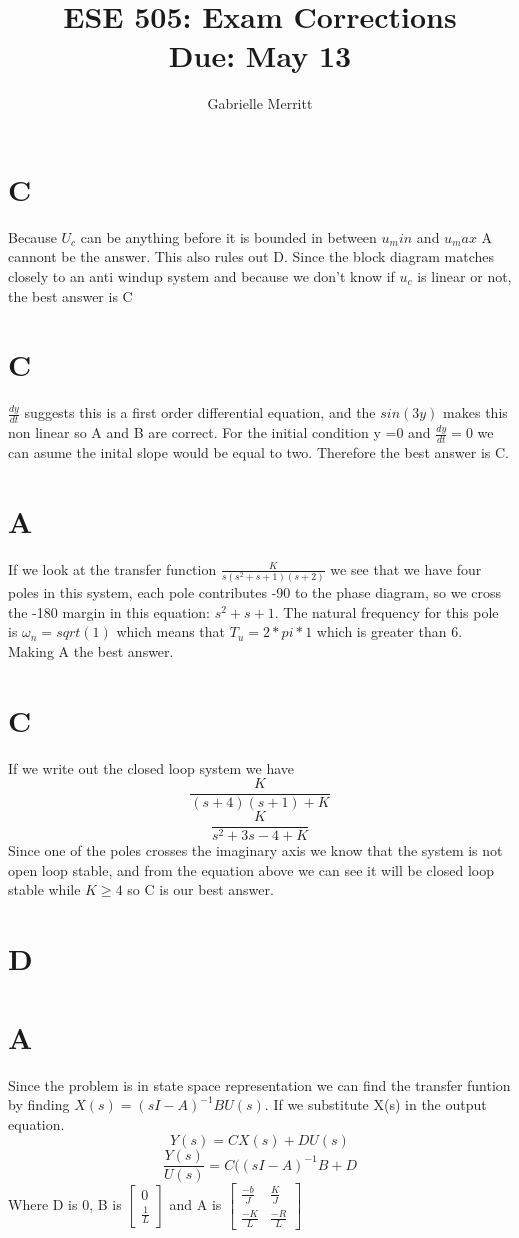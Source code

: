 \documentclass[11pt,english]{article}
\title{ESE 505: Exam Corrections\\
Due:  May 13}
\author{Gabrielle Merritt}
\date{}
\begin{document}
\maketitle
\section{C}
Because  $U_c$ can be anything before it is bounded in between $u_min$ and $u_max$ A cannont be the answer. This also rules out D. Since the block diagram matches closely to an anti windup system and because we don't know if $u_c$ is linear or not, the best answer is C 
\section{C}
$\frac{dy}{dt}$ suggests this is a first order differential equation, and the $sin(3y)$ makes this non linear so A and B are correct. For the initial condition y =0 and $\frac{dy}{dt} = 0 $ we can asume the inital slope would be equal to two. Therefore the best answer is C. 
\section{A} 
If we look at the transfer function 
$\frac{K}{s(s^2+s+1)(s+2)} $ we see that we have four poles in this system, each pole contributes -90 to the phase diagram, so we cross the -180 margin in this equation: $s^2+s+1$. The natural frequency for this pole is $\omega_n = sqrt(1)$ which means that $T_u = 2*pi* 1$ which is greater than 6. Making A the best answer. 
\section{C} 
If we write out the closed loop system we have 
$$\frac{K}{(s+4)(s+1) + K}$$
$$\frac{K}{s^2+3s -4 +K}$$ 
Since one of the poles crosses the imaginary axis we know that the system is not open loop stable, and from the equation above we can see it will be closed loop stable while $K \geq 4$ so C is our best answer. 
\section{D}
\section{A}
Since the problem is in state space representation we can find the transfer funtion by finding $X(s) = ( sI - A)^{-1} BU(s) $. If we substitute X(s) in the output equation. 
$$Y(s) = CX(s) + DU(s)$$
$$\frac{Y(s)}{U(s)} = C((sI - A)^{-1}B + D$$
Where D is 0, B is $\begin{bmatrix} 0 \\ \frac{1}{L}\end{bmatrix}$ and A is $\begin{bmatrix}
\frac{-b}{J} & \frac{K}{J} \\ \frac{-K}{L} & \frac{-R}{L}
\end{bmatrix}$
\end{document}
